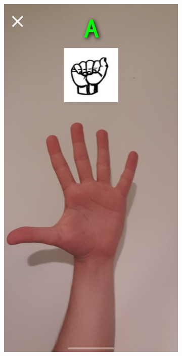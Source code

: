 \begin{figure}[H]
\begin{subfigure}{0.2\textwidth}
  \label{fig:start_learn_prompt}
  \end{subfigure}
 \begin{subfigure}{0.2\textwidth}
    \includegraphics[width=\textwidth]{images/3-aplicatia-android/learning_started.jpeg}

\end{subfigure}
\end{figure}
